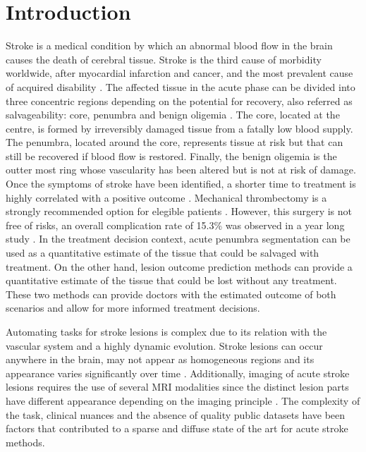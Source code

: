 \documentclass[letterpaper,final,authoryear,3p,times,twocolumn]{elsarticle}
\begin{document}
\section{Introduction}

Stroke is a medical condition by which an abnormal blood flow in the brain causes the death of cerebral tissue. Stroke is the third cause of morbidity worldwide, after myocardial infarction and cancer, and the most prevalent cause of acquired disability \citep{Redon2011}. The affected tissue in the acute phase can be divided into three concentric regions depending on the potential for recovery, also referred as salvageability: core, penumbra and benign oligemia \citep{Rekik2012}. The core, located at the centre, is formed by irreversibly damaged tissue from a fatally low blood supply. The penumbra, located around the core, represents tissue at risk but that can still be recovered if blood flow is restored. Finally, the benign oligemia is the outter most ring whose vascularity has been altered but is not at risk of damage. Once the symptoms of stroke have been identified, a shorter time to treatment is highly correlated with a positive outcome \citep{Sheth2015}. Mechanical thrombectomy is a strongly recommended option for elegible patients \citep{Campbell2017}. However, this surgery is not free of risks, an overall complication rate of 15.3\% was observed in a year long study \citep{Singh2017}. In the treatment decision context, acute penumbra segmentation can be used as a quantitative estimate of the tissue that could be salvaged with treatment. On the other hand, lesion outcome prediction methods can provide a quantitative estimate of the tissue that could be lost without any treatment. These two methods can provide doctors with the estimated outcome of both scenarios and allow for more informed treatment decisions.

Automating tasks for stroke lesions is complex due to its relation with the vascular system and a highly dynamic evolution. Stroke lesions can occur anywhere in the brain, may not appear as homogeneous regions and its appearance varies significantly over time \citep{Maier2017isles}. Additionally, imaging of acute stroke lesions requires the use of several MRI modalities since the distinct lesion parts have different appearance depending on the imaging principle \citep{Rekik2012}. The complexity of the task, clinical nuances and the absence of quality public datasets have been factors that contributed to a sparse and diffuse state of the art for acute stroke methods.
\end{document}
